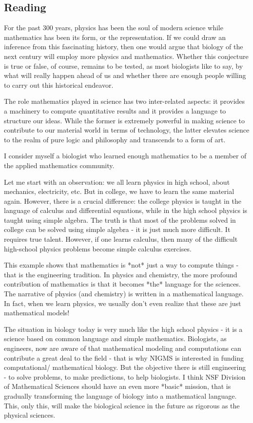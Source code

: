 


\subsection*{Reading}
For the past 300 years, physics has been the soul of modern science while mathematics has been its form, or the representation. If we could draw an inference from this fascinating history, then one would argue that biology of the next century will employ more physics and mathematics. Whether this conjecture is true or false, of course, remains to be tested, as most biologists like to say, by what will really happen ahead of us and whether there are enough people willing to carry out this historical endeavor.

The role mathematics played in science has two inter-related aspects: it provides a machinery to compute quantitative results and it provides a language to structure our ideas. While the former is extremely powerful in making science to contribute to our material world in terms of technology, the latter elevates science to the realm of pure logic and philosophy and transcends to a form of art.

I consider myself a biologist who learned enough mathematics to be a member of the applied mathematics community.

Let me start with an observation: we all learn physics in high school, about mechanics, electricity, etc. But in college, we have to learn the same material again. However, there is a crucial difference: the college physics is taught in the language of calculus and differential equations, while in the high school physics is taught using simple algebra. The truth is that most of the problems solved in college can be solved using simple algebra - it is just much more difficult. It requires true talent. However, if one learns calculus, then many of the difficult high-school physics problems become simple calculus exercises.

This example shows that mathematics is *not* just a way to compute things - that is the engineering tradition. In physics and chemistry, the more profound contribution of mathematics is that it becomes *the* language for the sciences. The narrative of physics (and chemistry) is written in a mathematical language. In fact, when we learn physics, we usually don't even realize that these are just mathematical models!

The situation in biology today is very much like the high school physics - it is a science based on common language and simple mathematics. Biologists, as engineers, now are aware of that mathematical modeling and computations can contribute a great deal to the field - that is why NIGMS is interested in funding computational/ mathematical biology. But the objective there is still engineering - to solve problems, to make predictions, to help biologists. I think NSF Division of Mathematical Sciences should have an even more *basic* mission, that is gradually transforming the language of biology into a mathematical language. This, only this, will make the biological science in the future as rigorous as the physical sciences.

